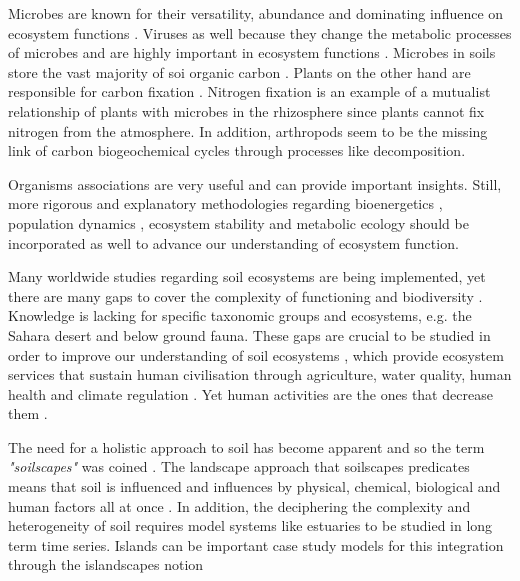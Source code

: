 Microbes are known for their versatility, abundance and dominating influence on ecosystem
functions \parencite{falkowski2008microbial}. 
Viruses as well because they
change the metabolic processes of microbes and are highly important in
ecosystem functions \parencite{hurwitz2016Viral}.
Microbes in soils store the vast majority of soi organic carbon \parencite{Crowther2019}.
Plants on the other hand are responsible for carbon fixation \parencite{thompson2012Food}.
Nitrogen fixation is an example of a mutualist relationship of plants with 
microbes in the rhizosphere since plants cannot fix nitrogen from the atmosphere.
In addition, arthropods seem to be the missing link of carbon biogeochemical 
cycles \parencite{GRANDY201640} through processes like decomposition.

Organisms associations are very useful and can
provide important insights. Still, more rigorous and explanatory methodologies
regarding bioenergetics \parencite{kempes2012Growth}, population dynamics
\parencite{gonze2018Microbial}, ecosystem stability \parencite{berdugo2020Global} and
metabolic ecology \parencite{brown2004METABOLIC} should be incorporated as well to
advance our understanding of ecosystem function.

Many worldwide studies regarding soil ecosystems are being implemented, yet
there are many gaps to cover the complexity of functioning and biodiversity
\parencite{guerra2020Blind}. Knowledge is lacking for specific taxonomic groups and
ecosystems, e.g. the Sahara desert and below ground fauna.
These gaps are crucial to be studied in order to
improve our understanding of soil ecosystems \parencite{cameron2018Global}, which
provide ecosystem services that sustain human civilisation 
through agriculture, water quality, human health and climate regulation \parencite{lehmann2020concept, lal2021the-role}.
Yet human activities are the ones that decrease them \parencite{rillig2023Increasing}. 

The need for a holistic approach to soil has become apparent and so the term \textit{"soilscapes"}
was coined \parencite{LAGACHERIE2001105}.
The landscape approach that soilscapes predicates means that soil is 
influenced and influences by physical, chemical, biological and 
human factors all at once \parencite{vogel2022}.
In addition, the deciphering the complexity and heterogeneity of soil requires 
model systems like estuaries \parencite{tsiknia2014} to be studied in long 
term time series.
Islands can be important case study models for this integration
through the islandscapes notion \parencite{Vogiatzakis_land_2017, Davies2016}

